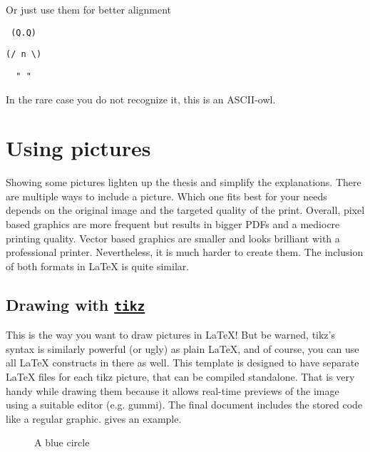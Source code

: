 \documentclass[\myrootdir/main.tex]{subfiles}
\begin{document}
Or just use them for better alignment

\begin{description}[align=right,labelwidth=2cm]
 \item [Head] \texttt{~(Q.Q)~}
 \item [Body] \texttt{(/~n~\textbackslash{})}
 \item [Feet] \texttt{~~"~"~~}
 \item [Info] In the rare case you do not recognize it, this is an ASCII-owl.
\end{description}


\section{Using pictures}

Showing some pictures lighten up the thesis and simplify the explanations.
There are multiple ways to include a picture.
Which one fits best for your needs depends on the original image and the targeted quality of the print.
Overall, pixel based graphics are more frequent but results in bigger PDFs and a mediocre printing quality.
Vector based graphics are smaller and looks brilliant with a professional printer.
Nevertheless, it is much harder to create them.
The inclusion of both formats in LaTeX is quite similar.

\subsection{Drawing with \href{https://ctan.org/pkg/pgf}{\texttt{tikz}}}

This is the way you want to draw pictures in LaTeX!
But be warned, tikz's syntax is similarly powerful (or ugly) as plain LaTeX, and of course, you can use all LaTeX constructs in there as well.
This template is designed to have separate LaTeX files for each tikz picture, that can be compiled standalone.
That is very handy while drawing them because it allows real-time previews of the image using a suitable editor (e.g. gummi).
The final document includes the stored code like a regular graphic.
 gives an example.

\begin{figure}[htb]
\centering

%
\caption{A blue circle}
\label{fig:bluecircle}
\end{figure}
\end{document}
